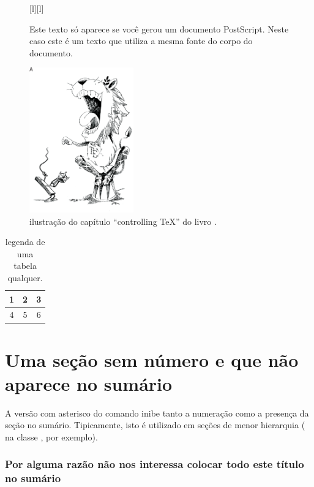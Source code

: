 \documentclass[a4paper,12pt]{report}
\begin{document}
	\begin{figure}
		\centering
		{\parbox{0.25\textwidth}{\tiny\color{red}Este texto só aparece se
			você gerou um documento PostScript. Neste caso este é um texto que utiliza a mesma
			fonte do corpo do documento.}}
		\includegraphics[width=0.4\textwidth]{Controlling_TeX}
		\caption{ilustração do capítulo ``controlling \TeX'' do livro \cite{knuth}.}
		\label{fig:TeX}
	\end{figure}

	\begin{table}
		\centering
		\begin{tabular}{ccc}
			\toprule
			1 & 2 & 3 \\
			\midrule
			4 & 5 & 6 \\
			\bottomrule
		\end{tabular}
		\caption{legenda de uma tabela qualquer.}
		\label{tab:tabela}
	\end{table}

	\section*{Uma seção sem número e que não aparece no sumário}
		
	A versão com asterisco do comando  inibe tanto a numeração como
	a presença da seção no sumário. Tipicamente, isto é utilizado em seções de
	menor hierarquia ( na classe , por exemplo).	
	
	\subsubsection*{Por alguma razão não nos interessa colocar todo este
	título no sumário}
		
\end{document}
